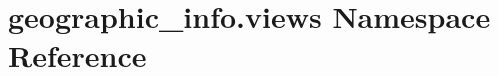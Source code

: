 \hypertarget{namespacegeographic__info_1_1views}{\section{geographic\-\_\-info.\-views Namespace Reference}
\label{namespacegeographic__info_1_1views}
}
